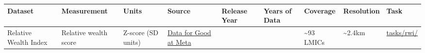 \documentclass[
  letterpaper,
  DIV=11,
  numbers=noendperiod]{scrreprt}
\newcounter{none} %
\begin{document}
{\def\LTcaptype{none} %
\begin{longtable}[]{@{}
  >{\raggedright\arraybackslash}p{}
  >{\raggedright\arraybackslash}p{}
  >{\raggedright\arraybackslash}p{}
  >{\raggedright\arraybackslash}p{}
  >{\raggedright\arraybackslash}p{}
  >{\raggedright\arraybackslash}p{}
  >{\raggedright\arraybackslash}p{}
  >{\raggedright\arraybackslash}p{}
  >{\raggedright\arraybackslash}p{}@{}}
\toprule\noalign{}
\begin{minipage}[b]{\linewidth}\raggedright
Dataset
\end{minipage} & \begin{minipage}[b]{\linewidth}\raggedright
Measurement
\end{minipage} & \begin{minipage}[b]{\linewidth}\raggedright
Units
\end{minipage} & \begin{minipage}[b]{\linewidth}\raggedright
Source
\end{minipage} & \begin{minipage}[b]{\linewidth}\raggedright
Release Year
\end{minipage} & \begin{minipage}[b]{\linewidth}\raggedright
Years of Data
\end{minipage} & \begin{minipage}[b]{\linewidth}\raggedright
Coverage
\end{minipage} & \begin{minipage}[b]{\linewidth}\raggedright
Resolution
\end{minipage} & \begin{minipage}[b]{\linewidth}\raggedright
Task
\end{minipage} \\
\midrule\noalign{}
\endhead
\bottomrule\noalign{}
\endlastfoot
Relative Wealth Index & Relative wealth score & Z-score (SD units) &
\href{https://data.humdata.org/dataset/relative-wealth-index}{Data for
Good at Meta} & 2021 & 2021 & \textasciitilde93 LMICs &
\textasciitilde2.4km & \href{../tasks/rwi/}{tasks/rwi/} \\
\end{longtable}
}
\end{document}
